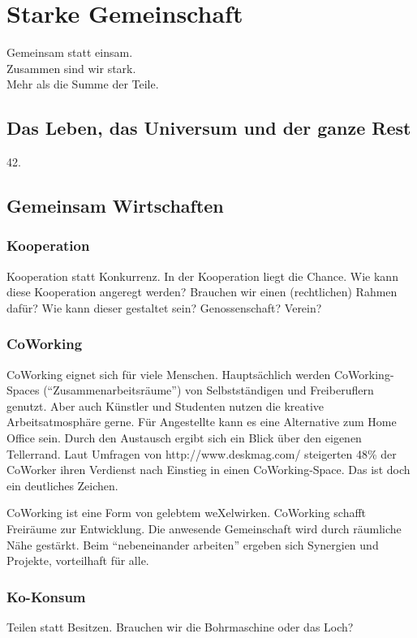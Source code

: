  \section{Starke Gemeinschaft}
Gemeinsam statt einsam.\\
Zusammen sind wir stark.\\
Mehr als die Summe der Teile.\\
    \subsection{Das Leben, das Universum und der ganze Rest}
42.
    \subsection{Gemeinsam Wirtschaften}
      \subsubsection{Kooperation}
Kooperation statt Konkurrenz.
%
In der Kooperation liegt die Chance.
%
Wie kann diese Kooperation angeregt werden?
%
Brauchen wir einen (rechtlichen) Rahmen dafür?
%
Wie kann dieser gestaltet sein? Genossenschaft? Verein?
      \subsubsection{CoWorking}
CoWorking eignet sich für viele Menschen.
%
Hauptsächlich werden CoWorking-Spaces ("`Zusammenarbeitsräume"') von Selbstständigen und Freiberuflern genutzt.
%
Aber auch Künstler und Studenten nutzen die kreative Arbeitsatmosphäre gerne.
%
Für Angestellte kann es eine Alternative zum Home Office sein.
%
Durch den Austausch ergibt sich ein Blick über den eigenen Tellerrand.
%
Laut Umfragen von http://www.deskmag.com/ steigerten 48\% der CoWorker ihren Verdienst nach Einstieg in einen CoWorking-Space.
%
Das ist doch ein deutliches Zeichen.



CoWorking ist eine Form von gelebtem weXelwirken.
%
CoWorking schafft Freiräume zur Entwicklung.
%
Die anwesende Gemeinschaft wird durch räumliche Nähe gestärkt.
%
Beim "`nebeneinander arbeiten"' ergeben sich Synergien und Projekte, vorteilhaft für alle.
      \subsubsection{Ko-Konsum}
Teilen statt Besitzen.
%
Brauchen wir die Bohrmaschine oder das Loch?
